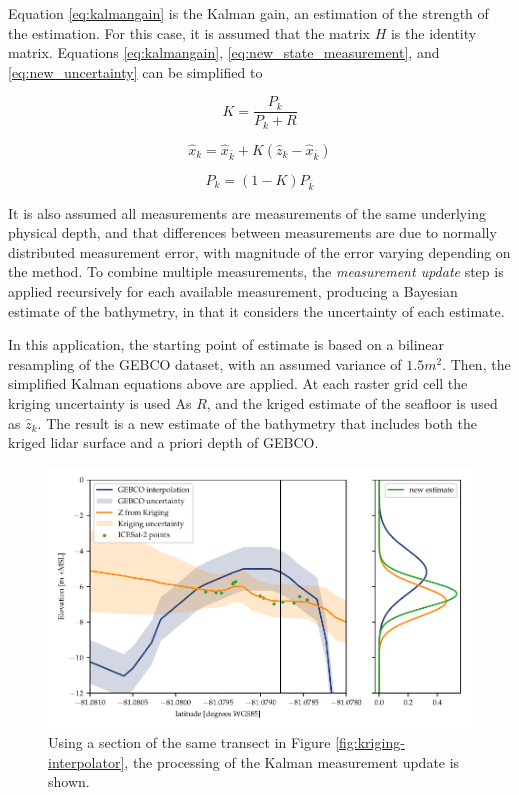 Equation \ref{eq:kalmangain} is the Kalman gain, an estimation of the strength of the estimation. For this case, it is assumed that the matrix $H$ is the identity matrix. Equations \ref{eq:kalmangain}, \ref{eq:new_state_measurement}, and \ref{eq:new_uncertainty} can be simplified to 

$$ K =  \frac{P_k}{P_k + R} $$

$$ \hat{x}_k =  \hat{x}_{\bar{k}} + K(\hat{z}_k -  \hat{x}_{\bar{k}}) $$


$$ P_k = (1 - K) P_{\bar{k}} $$


It is also assumed all measurements are measurements of the same underlying physical depth, and that differences between measurements are due to normally distributed measurement error, with magnitude of the error varying depending on the method. To combine multiple measurements, the \emph{measurement update} step is applied recursively for each available measurement, producing a Bayesian estimate of the bathymetry, in that it considers the uncertainty of each estimate. 

In this application, the starting point of estimate is based on a bilinear resampling of the GEBCO dataset, with an assumed variance of $1.5m^2$. Then, the simplified Kalman equations above are applied. At each raster grid cell the kriging uncertainty is used As $R$, and the kriged estimate of the seafloor is used as $\hat{z}_k$. The result is a new estimate of the bathymetry that includes both the kriged lidar surface and a priori depth of GEBCO. 

\begin{figure}[h]
    \centering
    \includegraphics[width=\textwidth]{figures/methodology-kalman-updating.pdf}
    \caption{Using a section of the same transect in Figure \ref{fig:kriging-interpolator}, the processing of the Kalman measurement update is shown. }
    \label{fig:kalman-figure}
\end{figure}

